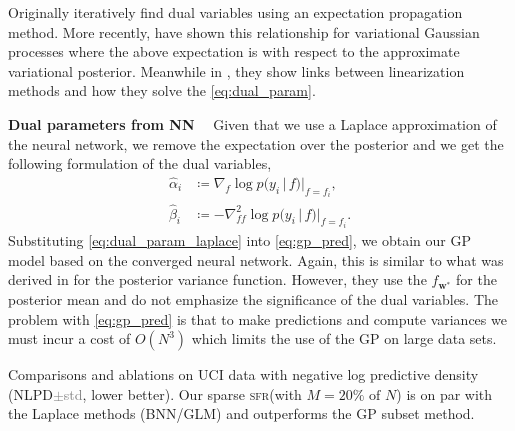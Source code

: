 \documentclass{article}
\renewcommand{\paragraph}[1]{{\bf #1}~~}
\newlength{\tblw}
\newcommand{\our}{\textsc{sfr}\xspace}
\newcommand{\mbf}[1]{\mathbf{#1}}
\renewcommand{\mid}{\,|\,}
\newcommand{\vw}{\mbf{w}}
\begin{document}
Originally \citet{csato2002sparse} iteratively find dual variables using an expectation propagation \citep[EP,][]{minka2001expectation} method. More recently, \citet{khan2017conjugate,adam2021dual} have shown this relationship for variational Gaussian processes where the above expectation is with respect to the approximate variational posterior. Meanwhile in \citet{wilkinson2023bayes}, they show links between linearization methods and how they solve the \cref{eq:dual_param}.

\paragraph{Dual parameters from NN}
Given that we use a Laplace approximation of the neural network, we remove the expectation over the posterior \citep[see Ch.~3.4.1 in][for derivation]{rasmussen2006gaussian} and we get the following formulation of the dual variables,
%
\begin{align}
  \label{eq:dual_param_laplace}
  \hat{\alpha}_i &\coloneqq \nabla_{f}\log p(y_i \mid f) |_{f=f_i} , \\
  \hat{\beta}_i &\coloneqq - \nabla^2_{ff}\log p(y_i \mid f) |_{f=f_i}.
\end{align}
%
Substituting \cref{eq:dual_param_laplace} into \cref{eq:gp_pred}, we obtain our GP model based on the converged neural network. Again, this is similar to what was derived in \citet{immer2021improving} for the posterior variance function. However, they use the $f_{\vw^*}$ for the posterior mean and do not emphasize the significance of the dual variables. The problem with \cref{eq:gp_pred} is that to make predictions and compute variances we must incur a cost of $O(N^3)$ which limits the use of the GP on large data sets.




\begin{table*}[t!]
  \centering\scriptsize
  \caption{Comparisons and ablations on UCI data with negative log predictive density (NLPD\textcolor{gray}{\footnotesize$\pm$std}, lower better). Our sparse \our (with $M=20\% \text{ of } N$) is on par with the Laplace methods (BNN/GLM) and outperforms the GP subset method.} %
	\label{tbl:uci}



	\newcommand{\val}[2]{%
		$#1$\textcolor{gray}{${\pm}#2$}
	}

	
\end{table*}
\end{document}
